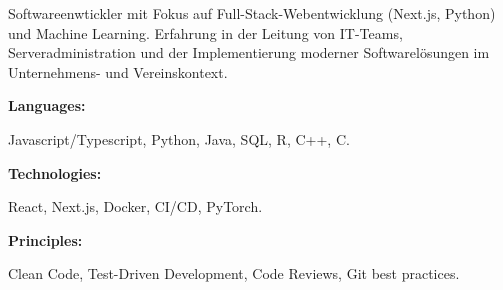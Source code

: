\documentclass[9pt]{developercv} %
\begin{document}
\begin{minipage}[t]{0.46\textwidth}
	\vspace{-6pt}


	Softwareenwtickler mit Fokus auf Full-Stack-Webentwicklung (Next.js, Python) und Machine Learning. Erfahrung in der Leitung von IT-Teams, Serveradministration und der Implementierung moderner Softwarelösungen im Unternehmens- und Vereinskontext.
\end{minipage}
\hfill %
\begin{minipage}[t]{0.465\textwidth}
	\vspace{-6pt}

	\begin{minipage}[t]{0.28\textwidth}
		\textbf{Languages:}
	\end{minipage}
	\hfill
	\begin{minipage}[t]{0.71\textwidth}
		Javascript/Typescript, Python, Java, SQL, R, C++, C.
	\end{minipage}
	\vspace{3mm}

	\begin{minipage}[t]{0.28\textwidth}
		\textbf{Technologies:}
	\end{minipage}
	\hfill
	\begin{minipage}[t]{0.71\textwidth}
		React, Next.js, Docker, CI/CD, PyTorch.
	\end{minipage}
	\vspace{-1mm}

	\begin{minipage}[t]{0.28\textwidth}
		\textbf{Principles:}
	\end{minipage}
	\hfill
	\begin{minipage}[t]{0.71\textwidth}
		Clean Code, Test-Driven Development, Code Reviews, Git best practices.
	\end{minipage}

\end{minipage}
\end{document}
